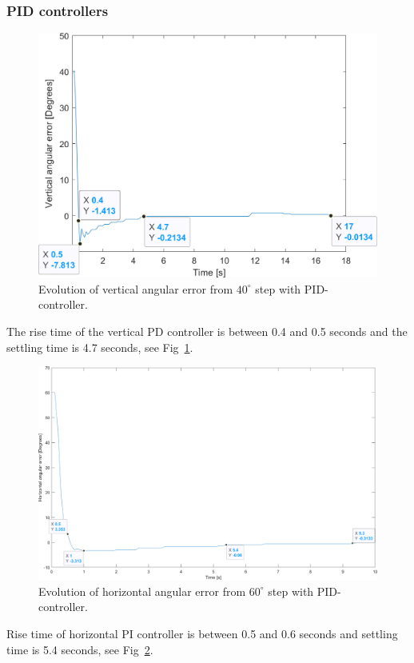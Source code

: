 \subsubsection{PID controllers}
\label{sec:simon15}
\begin{figure}[h]
\centering
\includegraphics[width=\linewidth]{sections/assets/Vertical_PID_controller.png}
\caption{Evolution of vertical angular error from \(40^{\circ}\) step with PID-controller.}
\label{vert_PID}
\end{figure}
The rise time of the vertical PD controller is between 0.4 and 0.5 seconds and the settling time is 4.7 seconds, see Fig~\ref{vert_PID}.
\begin{figure}[h]
\centering
\includegraphics[width=\linewidth]{sections/assets/Horizontal_PID_controller.png}
\caption{Evolution of horizontal angular error from \(60^{\circ}\) step with PID-controller.}
\label{Horizontal_PID}
\end{figure}
Rise time of horizontal PI controller is between 0.5 and 0.6 seconds and settling time is 5.4 seconds, see Fig~\ref{Horizontal_PID}.

